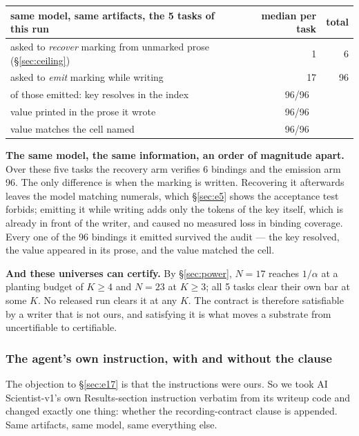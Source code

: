 \documentclass[10pt]{article}
\newcommand{\RM}[1]{{#1}}
\begin{document}
\begin{center}
\small
\begin{tabular}{@{}lrr@{}}
\toprule
same model, same artifacts, the \RM{5} tasks of this run & median per task & total \\
\midrule
asked to \emph{recover} marking from unmarked prose (\S\ref{sec:ceiling}) & \RM{1} & \RM{6} \\
asked to \emph{emit} marking while writing & \RM{17} & \RM{96} \\
\midrule
of those emitted: key resolves in the index & \multicolumn{2}{c}{\RM{96/96}} \\
value printed in the prose it wrote & \multicolumn{2}{c}{\RM{96/96}} \\
value matches the cell named & \multicolumn{2}{c}{\RM{96/96}} \\
\bottomrule
\end{tabular}
\end{center}

\noindent \textbf{The same model, the same information, an order of magnitude
apart.} Over these five tasks the recovery arm verifies \RM{6} bindings and the
emission arm \RM{96}. The only difference is when the marking is written. Recovering it
afterwards leaves the model matching numerals, which \S\ref{sec:e5} shows the
acceptance test forbids; emitting it while writing adds only the tokens of the
key itself, which is already in front of the writer, and caused no measured loss
in binding coverage. Every one of the \RM{96} bindings it
emitted survived the audit --- the key resolved, the value appeared in its
prose, and the value matched the cell.

\textbf{And these universes can certify.} By \S\ref{sec:power}, $N=\RM{17}$
reaches $1/\alpha$ at a planting budget of $K\ge\RM{4}$ and $N=\RM{23}$ at
$K\ge\RM{3}$; all \RM{5} tasks clear their own bar at some $K$. No released run
clears it at any $K$. The contract is therefore satisfiable by a writer that is
not ours, and satisfying it is what moves a substrate from uncertifiable to
certifiable.

\subsubsection{The agent's own instruction, with and without the clause}
\label{sec:e18}
The objection to \S\ref{sec:e17} is that the instructions were ours. So we took
AI Scientist-v1's own Results-section instruction verbatim from its writeup
code and changed exactly one thing: whether the recording-contract clause is
appended. Same artifacts, same model, same everything else.
\end{document}
